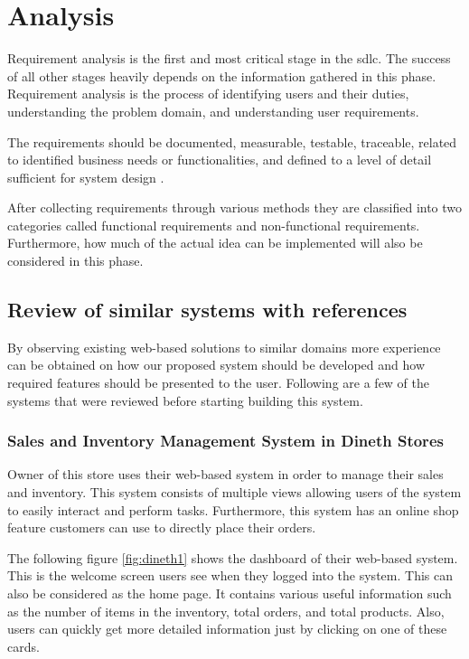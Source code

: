 \documentclass[12pt]{report}
\begin{document}

\newpage
\chapter{Analysis}

Requirement analysis is the first and most critical stage in the \acrlong{sdlc}. The success of all other stages heavily depends on the information gathered in this phase. Requirement analysis is the process of identifying users and their duties, understanding the problem domain, and understanding user requirements.

The requirements should be documented, measurable, testable, traceable, related to identified business needs or functionalities, and defined to a level of detail sufficient for system design \cite{sommerville_2008_se}.

After collecting requirements through various methods they are classified into two categories called functional requirements and non-functional requirements. Furthermore, how much of the actual idea can be implemented will also be considered in this phase.


\section{Review of similar systems with references}
By observing existing web-based solutions to similar domains more experience can be obtained on how our proposed system should be developed and how required features should be presented to the user.  Following are a few of the systems that were reviewed before starting building this system.
\subsection{Sales and Inventory Management System in Dineth Stores}
Owner of this store uses their web-based system in order to manage their sales and inventory. This system consists of multiple views allowing users of the system to easily interact and perform tasks.  Furthermore, this system has an online shop feature customers can use to directly place their orders.

The following figure \ref{fig:dineth1} shows the dashboard of their web-based system. This is the welcome screen users see when they logged into the system. This can also be considered as the home page. It contains various useful information such as the number of items in the inventory, total orders, and total products. Also, users can quickly get more detailed information just by clicking on one of these cards.
\end{document}
